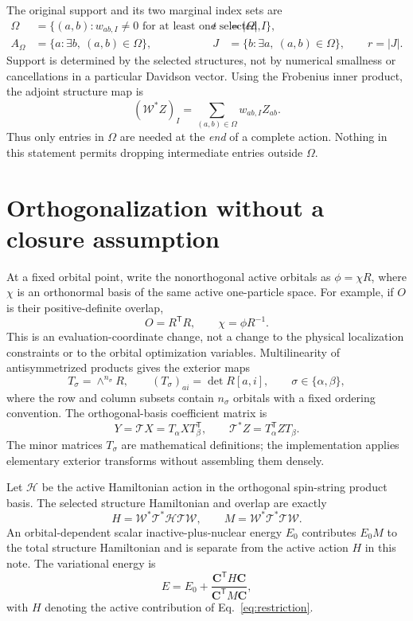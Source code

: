 \documentclass[11pt,a4paper]{article}
\newcommand{\Tr}{^{\mathsf T}}
\newcommand{\Wa}{\mathcal W}
\newcommand{\Ta}{\mathcal T}
\newcommand{\Ha}{\mathcal H}
\renewcommand{\vv}[1]{\mathbf{#1}}
\begin{document}
The original support and its two marginal index sets are
\begin{align}
 \Omega&=\{(a,b):w_{ab,I}\ne0\text{ for at least one selected }I\},
 &t&=|\Omega|,\\
 A_\Omega&=\{a:\exists b,\ (a,b)\in\Omega\},&
 J&=\{b:\exists a,\ (a,b)\in\Omega\},\qquad r=|J|.
\end{align}
Support is determined by the selected structures, not by numerical
smallness or cancellations in a particular Davidson vector.
Using the Frobenius inner product, the adjoint structure map is
\begin{equation}\label{eq:Wadj}
 (\Wa^*Z)_I=\sum_{(a,b)\in\Omega}w_{ab,I}Z_{ab}.
\end{equation}
Thus only entries in $\Omega$ are needed at the \emph{end} of a complete
action. Nothing in this statement permits dropping intermediate entries
outside $\Omega$.

\section{Orthogonalization without a closure assumption}

At a fixed orbital point, write the nonorthogonal active orbitals as
$\phi=\chi R$, where $\chi$ is an orthonormal basis of the same active
one-particle space. For example, if $O$ is their positive-definite overlap,
\begin{equation}
 O=R\Tr R,\qquad \chi=\phi R^{-1}.
\end{equation}
This is an evaluation-coordinate change, not a change to the physical
localization constraints or to the orbital optimization variables.
Multilinearity of antisymmetrized products gives the exterior maps
\begin{equation}
 T_\sigma=\wedge^{n_\sigma}R,\qquad
 (T_\sigma)_{a i}=\det R[a,i],\qquad \sigma\in\{\alpha,\beta\},
\end{equation}
where the row and column subsets contain $n_\sigma$ orbitals with a fixed
ordering convention. The orthogonal-basis coefficient matrix is
\begin{equation}\label{eq:T}
 Y=\Ta X=T_\alpha X T_\beta\Tr,\qquad
 \Ta^* Z=T_\alpha\Tr Z T_\beta.
\end{equation}
The minor matrices $T_\sigma$ are mathematical definitions; the
implementation applies elementary exterior transforms without assembling
them densely.

Let $\Ha$ be the active Hamiltonian action in the orthogonal spin-string
product basis. The selected structure Hamiltonian and overlap are exactly
\begin{equation}\label{eq:restriction}
 \boxed{\quad H=\Wa^*\Ta^*\Ha\Ta\Wa,\qquad
 M=\Wa^*\Ta^*\Ta\Wa.\quad}
\end{equation}
An orbital-dependent scalar inactive-plus-nuclear energy $E_0$ contributes
$E_0M$ to the total structure Hamiltonian and is separate from the active
action $H$ in this note.
The variational energy is
\begin{equation}
 E=E_0+\frac{\vv C\Tr H\vv C}{\vv C\Tr M\vv C},
\end{equation}
with $H$ denoting the active contribution of Eq.~\eqref{eq:restriction}.
\end{document}
